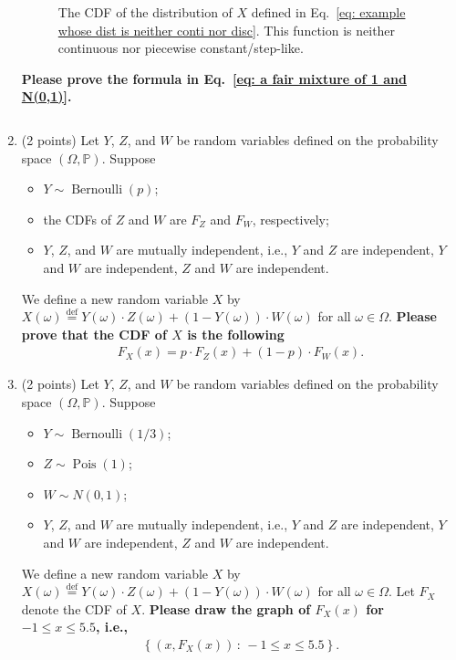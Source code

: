 \documentclass[11pt]{article}
\newcommand{\1}{\mathbbm{1}}
\begin{document}
\begin{enumerate}
\begin{figure}
    \caption{The CDF of the distribution of $X$ defined in Eq.~\eqref{eq: example whose dist is neither conti nor disc}. This function is neither continuous nor piecewise constant/step-like.}
    \label{fig: example whose dist is neither conti nor disc}
\end{figure}

\textbf{Please prove the formula in Eq.~\eqref{eq: a fair mixture of 1 and N(0,1)}.}

\[\]


\item (2 points) Let $Y$, $Z$, and $W$ be random variables defined on the probability space $(\Omega,\mathbb{P})$. Suppose
    \begin{itemize}
        \item $Y\sim\operatorname{Bernoulli}(p)$;
        \item the CDFs of $Z$ and $W$ are $F_Z$ and $F_W$, respectively;
        \item $Y$, $Z$, and $W$ are mutually independent, i.e., $Y$ and $Z$ are independent, $Y$ and $W$ are independent, $Z$ and $W$ are independent.
    \end{itemize} 
    We define a new random variable $X$ by $X(\omega)\overset{\operatorname{def}}{=} Y(\omega)\cdot Z(\omega) + (1-Y(\omega))\cdot W(\omega)$ for all $\omega\in\Omega$. \textbf{Please prove that the CDF of $X$ is the following}
    \begin{align*}
        F_X(x) = p\cdot F_Z(x)+(1-p)\cdot F_W(x).
    \end{align*}


\item (2 points) Let $Y$, $Z$, and $W$ be random variables defined on the probability space $(\Omega,\mathbb{P})$. Suppose
    \begin{itemize}
        \item $Y\sim\operatorname{Bernoulli}(1/3)$;
        \item $Z\sim \operatorname{Pois}(1)$;
        \item $W\sim N(0,1)$;
        \item $Y$, $Z$, and $W$ are mutually independent, i.e., $Y$ and $Z$ are independent, $Y$ and $W$ are independent, $Z$ and $W$ are independent.
    \end{itemize} 
    We define a new random variable $X$ by $X(\omega)\overset{\operatorname{def}}{=} Y(\omega)\cdot Z(\omega) + (1-Y(\omega))\cdot W(\omega)$ for all $\omega\in\Omega$. Let $F_X$ denote the CDF of $X$. \textbf{Please draw the graph of $F_X(x)$ for $-1\le x\le 5.5$, i.e., }
    \begin{align*}
        \left\{\left(x, F_X(x)\right) \,:\, -1\le x\le 5.5\right\}.
    \end{align*}



\end{enumerate}
\end{document}
